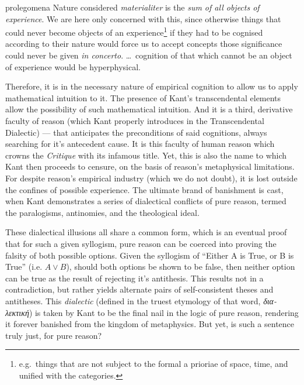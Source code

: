 \begin{displaycquote}[4:296]{prolegomena}
  Nature considered \emph{materialiter} is the \emph{sum of all objects of experience}. We are here only concerned with this, since otherwise things that could never become objects of an experience\footnote{e.g.\ things that are not subject to the formal a prioriae of space, time, and unified with the categories.} if they had to be cognised according to their nature would force us to accept concepts those significance could never be given \emph{in concerto}. \ldots\ cognition of that which cannot be an object of experience would be hyperphysical.
\end{displaycquote}

\noindent
Therefore, it is in the necessary nature of empirical cognition to allow us to apply mathematical intuition to it. The presence of Kant's transcendental elements allow the possibility of such mathematical intuition. And it is a third, derivative faculty of reason (which Kant properly introduces in the Transcendental Dialectic) --- that anticipates the preconditions of said cognitions, always searching for it's antecedent cause. It is this faculty of human reason which crowns the \emph{Critique} with its infamous title. Yet, this is also the name to which Kant then proceeds to censure, on the basis of reason's metaphysical limitations. For despite reason's empirical industry (which we do not doubt), it is lost outside the confines of possible experience. The ultimate brand of banishment is cast, when Kant demonstrates a series of dialectical conflicts of pure reason, termed the paralogisms, antinomies, and the theological ideal.

These dialectical illusions all share a common form, which is an eventual proof that for such a given syllogism, pure reason can be coerced into proving the falsity of both possible options. Given the syllogism of \enquote{Either A is True, or B is True} (i.e. \(A \lor B\)), should both options be shown to be false, then neither option can be true as the result of rejecting it's antithesis. This results not in a contradiction, but rather yields alternate pairs of self-consistent theses and antitheses. This \emph{dialectic} (defined in the truest etymology of that word, \emph{δια-λεκτική}) is taken by Kant to be the final nail in the logic of pure reason, rendering it forever banished from the kingdom of metaphysics. But yet, is such a sentence truly just, for pure reason?

